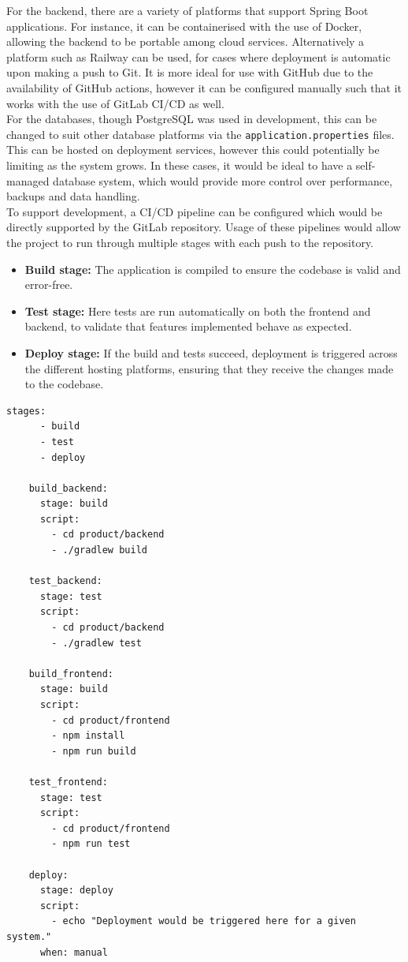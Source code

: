 \documentclass[]{final_report}
\begin{document}
For the backend, there are a variety of platforms that support Spring Boot applications. For instance, it can be containerised with the use of Docker, allowing the backend to be portable among cloud services. Alternatively a platform such as Railway can be used, for cases where deployment is automatic upon making a push to Git. It is more ideal for use with GitHub due to the availability of GitHub actions, however it can be configured manually such that it works with the use of GitLab CI/CD as well.\\

For the databases, though PostgreSQL was used in development, this can be changed to suit other database platforms via the \verb|application.properties| files. This can be hosted on deployment services, however this could potentially be limiting as the system grows. In these cases, it would be ideal to have a self-managed database system, which would provide more control over performance, backups and data handling.\\

To support development, a CI/CD pipeline can be configured which would be directly supported by the GitLab repository. Usage of these pipelines would allow the project to run through multiple stages with each push to the repository.

\begin{itemize}
	\item \textbf{Build stage:} The application is compiled to ensure the codebase is valid and error-free.
	\item \textbf{Test stage:} Here tests are run automatically on both the frontend and backend, to validate that features implemented behave as expected.
	\item \textbf{Deploy stage:} If the build and tests succeed, deployment is triggered across the different hosting platforms, ensuring that they receive the changes made to the codebase.
\end{itemize}

\begin{lstlisting}[caption={A general idea for a GitLab CI/CD pipeline configuration for the project. The backend is built and tested first before the frontend, after which both can be deployed together.}]
	stages:
	  - build
	  - test
	  - deploy
	
	build_backend:
	  stage: build
	  script:
		- cd product/backend
		- ./gradlew build
	
	test_backend:
	  stage: test
	  script:
		- cd product/backend
		- ./gradlew test
	
	build_frontend:
	  stage: build
	  script:
		- cd product/frontend
		- npm install
		- npm run build
	
	test_frontend:
	  stage: test
	  script:
		- cd product/frontend
		- npm run test
	
	deploy:
	  stage: deploy
	  script:
		- echo "Deployment would be triggered here for a given system."
	  when: manual
\end{lstlisting}
	
\end{document}
